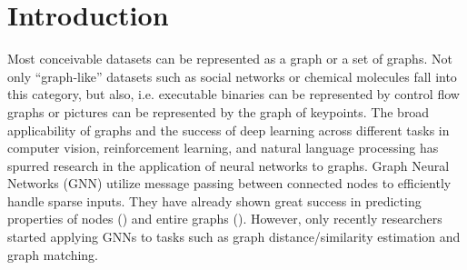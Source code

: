 \section{Introduction}

Most conceivable datasets can be represented as a graph or a set of graphs. Not only “graph-like” datasets such as social networks or chemical molecules fall into this category, but also, i.e. executable binaries can be represented by control flow graphs or pictures can be represented by the graph of keypoints. %
The broad applicability of graphs and the success of deep learning across different tasks in computer vision, reinforcement learning, and natural language processing has spurred research in the application of neural networks to graphs. Graph Neural Networks (GNN) utilize message passing between connected nodes to efficiently handle sparse inputs. They have already shown great success in predicting properties of nodes (\cite{kipf2017}) and entire graphs (\citealp{gilmer2017}). However, only recently researchers started applying GNNs to tasks such as graph distance/similarity estimation and graph matching.

